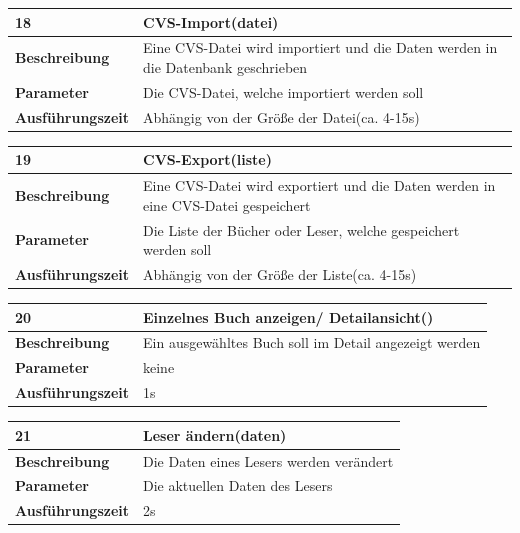 \documentclass[fontsize=12pt,paper=a4,twoside]{scrartcl}
\begin{document}
\newpage
  \begin{table}[htbp]
  \label{a18}
  \begin{tabular}{|l|p{10cm}|}
  \hline 
  \textbf{18} & \textbf{CVS-Import(datei)} \\ \hline
  \textbf{Beschreibung} & Eine CVS-Datei wird importiert und die Daten werden in die Datenbank geschrieben\\ \hline
  \textbf{Parameter} & Die CVS-Datei, welche importiert werden soll \\ \hline
  \textbf{Ausführungszeit} & Abhängig von der Größe der Datei(ca. 4-15s)\\ \hline
  \end{tabular}
  \end{table}

\newpage

  \begin{table}[htbp]
  \label{a19}
  \begin{tabular}{|l|p{10cm}|}
  \hline 
  \textbf{19} & \textbf{CVS-Export(liste)} \\ \hline
  \textbf{Beschreibung} & Eine CVS-Datei wird exportiert und die Daten werden in eine CVS-Datei gespeichert\\ \hline
  \textbf{Parameter} & Die Liste der Bücher oder Leser, welche gespeichert werden soll \\ \hline
  \textbf{Ausführungszeit} & Abhängig von der Größe der Liste(ca. 4-15s)\\ \hline
  \end{tabular}
  \end{table}

  \begin{table}[htbp]
  \label{a20}
  \begin{tabular}{|l|p{10cm}|}
  \hline 
  \textbf{20} & \textbf{Einzelnes Buch anzeigen/ Detailansicht()} \\ \hline
  \textbf{Beschreibung} & Ein ausgewähltes Buch soll im Detail angezeigt werden\\ \hline
  \textbf{Parameter} & keine \\ \hline
  \textbf{Ausführungszeit} & 1s\\ \hline
  \end{tabular}
  \end{table}

  \begin{table}[htbp]
  \label{a21}
  \begin{tabular}{|l|p{10cm}|}
  \hline 
  \textbf{21} & \textbf{Leser ändern(daten)} \\ \hline
  \textbf{Beschreibung} & Die Daten eines Lesers werden verändert\\ \hline
  \textbf{Parameter} & Die aktuellen Daten des Lesers \\ \hline
  \textbf{Ausführungszeit} & 2s\\ \hline
  \end{tabular}
  \end{table}
\end{document}
